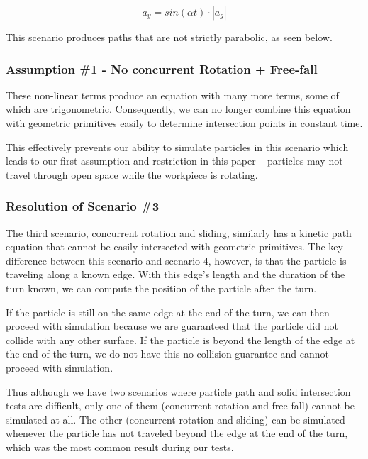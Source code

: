 $$
a_y = sin(\alpha t) \cdot |a_g|
$$

This scenario produces paths that are not strictly parabolic, as seen below.


		\subsubsection{Assumption \#1 - No concurrent Rotation + Free-fall}

These non-linear terms produce an equation with many more terms, some of which are trigonometric. Consequently, we can no longer combine this equation with geometric primitives easily to determine intersection points in constant time.

This effectively prevents our ability to simulate particles in this scenario which leads to our first assumption and restriction in this paper -- particles may not travel through open space while the workpiece is rotating.

		\subsubsection{Resolution of Scenario \#3}

The third scenario, concurrent rotation and sliding, similarly has a kinetic path equation that cannot be easily intersected with geometric primitives. The key difference between this scenario and scenario 4, however, is that the particle is traveling along a known edge. With this edge's length and the duration of the turn known, we can compute the position of the particle after the turn.

If the particle is still on the same edge at the end of the turn, we can then proceed with simulation because we are guaranteed that the particle did not collide with any other surface. If the particle is beyond the length of the edge at the end of the turn, we do not have this no-collision guarantee and cannot proceed with simulation.

Thus although we have two scenarios where particle path and solid intersection tests are difficult, only one of them (concurrent rotation and free-fall) cannot be simulated at all. The other (concurrent rotation and sliding) can be simulated whenever the particle has not traveled beyond the edge at the end of the turn, which was the most common result during our tests.


